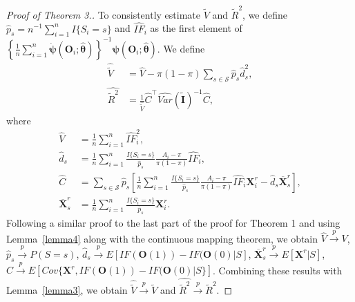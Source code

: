 \documentclass[12pt]{article}
\newcommand{\bX}{\boldsymbol{X}}
\newcommand{\bO}{\boldsymbol{O}}
\newcommand{\bI}{\boldsymbol{I}}
\newcommand{\btheta}{\boldsymbol{\theta}}
\newcommand{\bpsi}{\boldsymbol{\psi}}
\begin{document}
\begin{proof}[Proof of Theorem 3.]
To consistently estimate $\widetilde{V}$ and $\widetilde{R}^2$, we define 
$\widehat{p}_s= n^{-1}\sum_{i=1}^n I\{S_i=s\}$ and 
$\widehat{IF}_i$ as the first element of $\left\{ \frac{1}{n}\sum_{i=1}^n \dot{\bpsi}(\bO_i; \widehat{\btheta}) \right\}^{-1} \bpsi(\bO_i; \widehat{\btheta})$. We define
\begin{align}
    \widehat{\widetilde{V}} &= \widehat{V} - \pi(1-\pi) \sum_{s \in \mathcal{S}} \widehat{p}_s \widehat{d}_s^2, \label{def: vv-hat}\\
    \widehat{\widetilde{R}^2} &= \frac{1}{\widehat{\widetilde{V}}} \widehat{C}^\top \widehat{Var}(\widetilde{\bI})^{-1} \widehat{C}, \label{def: rr-hat}
\end{align}
where
\begin{align*}
    \widehat{V} & = \frac{1}{n} \sum_{i=1}^n\widehat{IF}_i^2, \\
    \widehat{d}_s &= \frac{1}{n} \sum_{i=1}^n \frac{I\{S_i=s\}} {\widehat{p}_s} \frac{A_i-\pi}{\pi(1-\pi)}  \widehat{IF}_i, \\
    \widehat{C} &=  \sum_{s \in \mathcal{S}} \widehat{p}_s \left[ \frac{1}{n}\sum_{i=1}^n \frac{I\{S_i=s\}}{\widehat{p}_s}  \frac{A_i-\pi}{\pi(1-\pi)}  \widehat{IF}_i \bX_i^r -\widehat{d}_s\overline{\bX}_s^r \right], \\
    \overline{\bX}_s^r &= \frac{1}{n} \sum_{i=1}^n \frac{I\{S_i=s\}} {\widehat{p}_s}\bX_i^r. 
\end{align*}
Following a similar proof to the last part of the proof for Theorem 1 and using Lemma~\ref{lemma4} along with the continuous mapping theorem, we obtain $\widehat{V} \xrightarrow{p} V$, $\widehat{p}_s \xrightarrow{p} P(S=s)$, $\widehat{d}_s \xrightarrow{p} E[IF(\bO(1))-IF(\bO(0)|S]$, $\overline{\bX}_s^r \xrightarrow{p} E[\bX^r|S]$, $\widehat{C} \xrightarrow{p} E[Cov\{\bX^r, IF(\bO(1))-IF(\bO(0)|S\}]$. Combining these results with Lemma~\ref{lemma3}, we obtain $\widehat{\widetilde{V}} \xrightarrow{p} \widetilde{V}$ and $\widehat{\widetilde{R}^2} \xrightarrow{p} \widetilde{R}^2$.
\end{proof}
\end{document}
